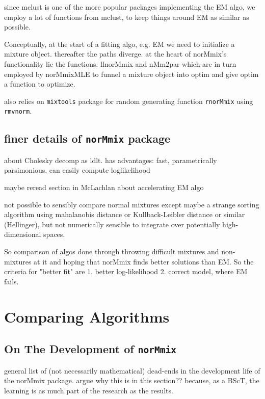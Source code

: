 since mclust is one of the more popular packages implementing the EM algo, we 
employ a lot of functions from mclust, to keep things around EM as similar as 
possible.

Conceptually, at the start of a fitting algo, e.g. EM we need to initialize a
mixture object. %
thereafter the paths diverge. at the heart of norMmix's functionality
lie the functions: llnorMmix and nMm2par which are in turn employed by 
norMmixMLE to funnel a mixture object into optim and give optim a function
to optimize.

also relies on {\tt mixtools} package for random generating function 
{\tt rnorMmix} using {\tt rmvnorm}.

\section{finer details of {\tt norMmix} package}

about Cholesky decomp as ldlt. has advantages: fast, parametrically 
parsimonious, can easily compute loglikelihood


maybe reread section in McLachlan about accelerating EM algo

not possible to sensibly compare normal mixtures except maybe a strange sorting 
algorithm using mahalanobis distance or Kullback-Leibler distance or similar
(Hellinger), but not numerically sensible to integrate over potentially 
high-dimensional spaces.

So comparison of algos done through throwing difficult mixtures and 
non-mixtures at it and hoping that norMmix finds better solutions than EM. So
the criteria for "better fit" are 1. better log-likelihood 2. correct model, 
where EM fails.





\chapter{Comparing Algorithms}

\section{On The Development of {\tt norMmix}}

general list of (not necessarily mathematical) dead-ends in the development 
life of the norMmix package.
argue why this is in this section?? because, as a BScT, the learning is as much
part of the research as the results.


